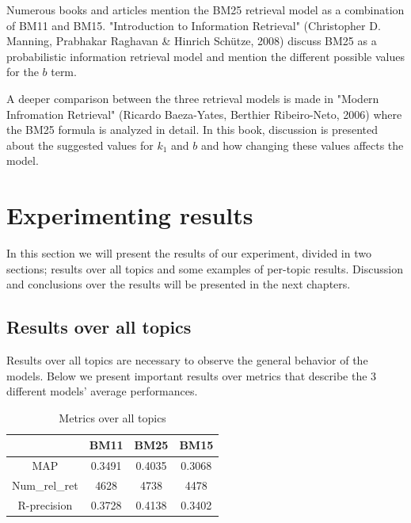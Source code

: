 \documentclass[letterpaper,11pt]{article}
\begin{document}
Numerous books and articles mention the BM25 retrieval model as a combination of BM11 and BM15. "Introduction to Information Retrieval"  (Christopher D. Manning, Prabhakar Raghavan \& Hinrich Schütze, 2008) discuss BM25 as a probabilistic information retrieval model and mention the different possible values for the $b$ term. 

A deeper comparison between the three retrieval models is made in "Modern Infromation Retrieval" (Ricardo Baeza-Yates, Berthier Ribeiro-Neto, 2006) where the BM25 formula is analyzed in detail. In this book, discussion is presented about the suggested values for $k_1$ and $b$ and how changing these values affects the model. 



\section{Experimenting results}

In this section we will present the results of our experiment, divided in two sections; results over all topics and some examples of per-topic results. Discussion and conclusions over the results will be presented in the next chapters.

\subsection{Results over all topics}


Results over  all topics are necessary to observe the general behavior of the models. Below we present important results over metrics that describe the 3 different models' average performances.


\begin{center}
\begin{table}[ht]
\centering
\begin{tabular}{c | c c c}
   & BM11  & BM25 & BM15  \\  \hline
MAP & 0.3491 & 0.4035 & 0.3068 \\
Num\_rel\_ret & 4628 & 4738 & 4478 \\
R-precision & 0.3728 & 0.4138 & 0.3402
\end{tabular}
\caption{Metrics over all topics}  
\end{table}
\end{center}
\end{document}
